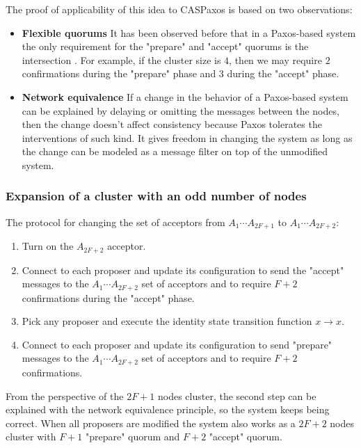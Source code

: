 \documentclass[a4paper,USenglish]{lipics-v2018}
\theoremstyle{definition}
\begin{document}
    The proof of applicability of this idea to CASPaxos is based on two observations:

    \begin{itemize}
        \item {\bf Flexible quorums} It has been observed before that in a Paxos-based system the only requirement for the "prepare" and "accept" quorums is the intersection \cite{abcds}\cite{vertical}\cite{fpaxos}. For example, if the cluster size is $4$, then we may require $2$ confirmations during the "prepare" phase and $3$ during the "accept" phase.
    
        \item {\bf Network equivalence} If a change in the behavior of a Paxos-based system can be explained by delaying or omitting the messages between the nodes, then the change doesn't affect consistency because Paxos tolerates the interventions of such kind. It gives freedom in changing the system as long as the change can be modeled as a message filter on top of the unmodified system.
    \end{itemize}

\subsubsection{Expansion of a cluster with an odd number of nodes}

    The protocol for changing the set of acceptors from $A_1 \cdots A_{2F+1}$ to $A_1 \cdots A_{2F+2}$:
    \begin{enumerate}
        \item Turn on the $A_{2F+2}$ acceptor.
        
        \item Connect to each proposer and update its configuration to send the "accept" messages to the $A_1 \cdots A_{2F+2}$ set of acceptors and to require $F+2$ confirmations during the "accept" phase.\label{dual}
        
        \item Pick any proposer and execute the identity state transition function $x \to x$.\label{rescan}
        
        \item Connect to each proposer and update its configuration to send "prepare" messages to the $A_1 \cdots A_{2F+2}$ set of acceptors and to require $F+2$ confirmations.
    \end{enumerate}

    From the perspective of the $2F+1$ nodes cluster, the second step can be explained with the network equivalence principle, so the system keeps being correct. When all proposers are modified the system also works as a $2F+2$ nodes cluster with $F+1$ "prepare" quorum and $F+2$ "accept" quorum.
\end{document}
